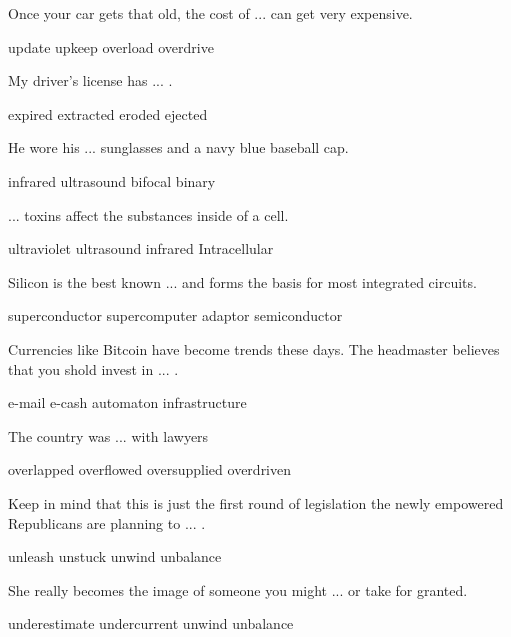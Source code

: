 \documentclass{exam}
\begin{document}
\begin{questions}
\question Once your car gets that old, the cost of ... can get very expensive.\\
\begin{oneparchoices}
\choice update 
\correctchoice upkeep
 \choice overload
 \choice overdrive 
\end{oneparchoices}
\question My driver's license has ... .\\
\begin{oneparchoices} 
\correctchoice expired
 \choice extracted 
 \choice eroded
 \choice ejected
\end{oneparchoices}
\question He wore his ... sunglasses and a navy blue baseball cap.\\
\begin{oneparchoices} 
\choice infrared
 \choice ultrasound
\correctchoice bifocal
 \choice binary 
\end{oneparchoices}
\question ... toxins affect the substances inside of a cell.\\
\begin{oneparchoices}
\choice ultraviolet
\choice ultrasound
\choice infrared
\correctchoice Intracellular
\end{oneparchoices}
\question Silicon is the best known ... and forms the basis for most integrated circuits.\\
\begin{oneparchoices} 
\choice superconductor
\choice supercomputer
\choice adaptor
\correctchoice semiconductor
\end{oneparchoices}
\question Currencies like Bitcoin have become trends these days. The headmaster believes that you shold invest in ... .\\
\begin{oneparchoices}
\choice e-mail
\correctchoice e-cash
\choice automaton
\choice infrastructure

\end{oneparchoices}
\question The country was ... with lawyers\\
\begin{oneparchoices} 
\choice overlapped
\choice overflowed
\correctchoice oversupplied 
\choice overdriven
\end{oneparchoices}
\question Keep in mind that this is just the first round of legislation the newly empowered Republicans are planning to ... .\\
\begin{oneparchoices} 
\correctchoice unleash
\choice unstuck
\choice unwind
\choice unbalance 
\end{oneparchoices}
\question She really becomes the image of someone you might ... or take for granted.\\
\begin{oneparchoices} 
\correctchoice underestimate
\choice undercurrent
\choice unwind
\choice unbalance
\end{oneparchoices}



\end{questions}
\end{document}
